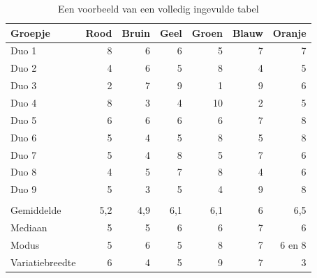 \begin{table}[H]
 \centering
 \begin{tabular}{|l||r|r|r|r|r|r|}\hline
  Groepje&	Rood&	Bruin&	Geel& Groen& Blauw& Oranje\\\hline
Duo 1&	8& 6& 6&  5&  7& 7\\\hline
Duo 2&	4& 6& 5&  8&  4& 5\\\hline
Duo 3&	2& 7& 9&  1&  9& 6\\\hline
Duo 4&	8& 3& 4&  10&  2& 5\\\hline
Duo 5&	6& 6& 6&  6&  7& 8\\\hline
Duo 6&	5& 4& 5&  8&  5& 8\\\hline
Duo 7&	5& 4& 8&  5&  7& 6\\\hline
Duo 8&	4& 5& 7&  8&  4& 6\\\hline
Duo 9&	5& 3& 5&  4&  9& 8\\\hline
&	& & &  &  & \\\hline
Gemiddelde&	5,2& 4,9& 6,1&  6,1&  6& 6,5\\\hline
Mediaan&	5& 5& 6&  6&  7& 6\\\hline
Modus&	5& 6& 5&  8&  7& 6 en 8\\\hline
Variatiebreedte&	6& 4& 5&  9&  7& 3\\\hline
  \end{tabular}
  \caption{Een voorbeeld van een volledig ingevulde tabel}
  \label{tab: tabel3}
 \end{table}

